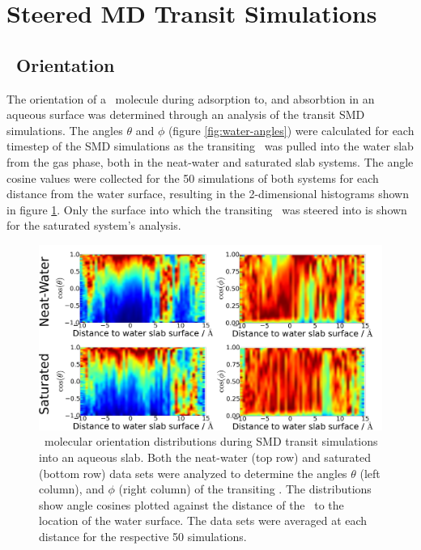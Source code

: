 \section{Steered MD Transit Simulations}

\subsection {\suldiox~Orientation}

	The orientation of a \suldiox~molecule during adsorption to, and absorbtion in an aqueous surface was determined through an analysis of the transit SMD simulations. The angles $\theta$ and $\phi$ (figure \ref{fig:water-angles}) were calculated for each timestep of the SMD simulations as the transiting \suldiox~was pulled into the water slab from the gas phase, both in the neat-water and saturated slab systems. The angle cosine values were collected for the 50 simulations of both systems for each distance from the water surface, resulting in the 2-dimensional histograms shown in figure \ref{fig:so2-transit-angles}. Only the surface into which the transiting \suldiox~was steered into is shown for the saturated system's analysis.

\begin{figure}[h!]
	\begin{center}
		\includegraphics[scale=1.0]{images/transit-so2-angles/so2-angles-transit.png}
		\caption{\suldiox~molecular orientation distributions during SMD transit simulations into an aqueous slab. Both the neat-water (top row) and saturated (bottom row) data sets were analyzed to determine the angles $\theta$ (left column), and $\phi$ (right column) of the transiting \suldiox. The distributions show angle cosines plotted against the distance of the \suldiox~to the location of the water surface. The data sets were averaged at each distance for the respective 50 simulations.}
		\label{fig:so2-transit-angles}
	\end{center}
\end{figure}

